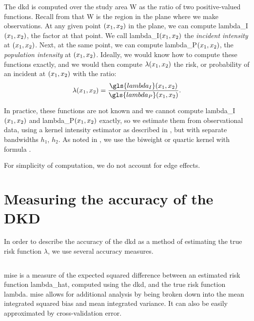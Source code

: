 The \gls{dkd} is computed over the study area \gls{W} as the ratio of two positive-valued functions.
Recall from  that \gls{W} is the region in the plane where we make observations.
At any given point $(x_1, x_2)$ in the plane, we can compute \gls{lambda_I}$(x_1, x_2)$, the \gls{factor} at that point.
We call \gls{lambda_I}$(x_1, x_2)$ the \textit{incident intensity} at $(x_1, x_2)$.
Next, at the same point, we can compute \gls{lambda_P}$(x_1, x_2)$, the \textit{population intensity} at $(x_1, x_2)$.
Ideally, we would know how to compute these functions exactly, and we would then compute $\lambda(x_1, x_2)$ the risk,
or probability of an incident at $(x_1, x_2)$ with the ratio:
\begin{equation}
    \lambda\xvec = \frac{\gls{lambda_I}\xvec}{\gls{lambda_P}\xvec}.
\end{equation}

In practice, these functions are not known and we cannot compute \gls{lambda_I}$(x_1, x_2)$ and \gls{lambda_P}$(x_1, x_2)$ exactly, 
so we estimate them from observational data,
using a \gls{kernel intensity estimator} as described in ,
but with separate bandwidths $h_1$, $h_2$.
As noted in ,
we use the biweight or quartic kernel with formula .

For simplicity of computation, we do not account for edge effects.


\section{Measuring the accuracy of the DKD}
\label{sec:method:accuracy}

In order to describe the accuracy of the \gls{dkd} as a method of estimating the true risk function $\lambda$,
we use several accuracy measures.

\subsection{\texorpdfstring{}{}}
\label{subsec:method:mise}

\Gls{mise} is a measure of the expected squared difference between an estimated risk function \gls{lambda_hat},
computed using the \gls{dkd}, and the true risk function \gls{lambda}.
\Gls{mise} allows for additional analysis by being broken down into the mean integrated squared bias and mean integrated variance.
It can also be easily approximated by cross-validation error.

